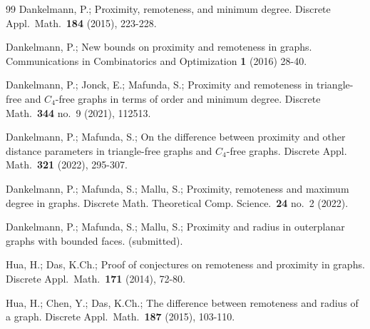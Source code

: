 \documentclass[a4paper,11pt]{article}
\begin{document}
\begin{thebibliography}{99}
 Dankelmann, P.; 
     Proximity, remoteness, and minimum degree. 
     Discrete Appl.\ Math.\ {\bf 184} (2015), 223-228.    

 Dankelmann, P.; 
     New bounds on proximity and remoteness in graphs. 
     Communications in Combinatorics and Optimization {\bf 1} (2016) 28-40.     
        
  Dankelmann, P.; Jonck, E.; Mafunda, S.; 
     Proximity and remoteness in triangle-free and $C_4$-free graphs in terms of order and minimum degree. 
     Discrete Math.\ {\bf 344} no.\ 9 (2021), 112513.
      
  Dankelmann, P.; Mafunda, S.;     
     On the difference between proximity and other distance parameters in triangle-free 
     graphs and $C_4$-free graphs. 
     Discrete Appl. Math.\ {\bf 321} (2022), 295-307.    

  Dankelmann, P.; Mafunda, S.; Mallu, S.;
     Proximity, remoteness and maximum degree in graphs. 
     Discrete Math. Theoretical Comp. Science.\ {\bf 24} no.\ 2 (2022).
     
  Dankelmann, P.; Mafunda, S.; Mallu, S.;
     Proximity and radius in outerplanar graphs with bounded faces. 
     (submitted).     
     
      
  Hua, H.;  Das, K.Ch.;
     Proof of conjectures on remoteness and proximity in graphs.
     Discrete Appl.\ Math.\ {\bf 171} (2014), 72-80.   
       
 Hua, H.; Chen, Y.;  Das, K.Ch.;
     The difference between remoteness and radius of a graph. 
     Discrete Appl.\ Math.\ {\bf 187} (2015), 103-110.   
   
   
     
     

\end{thebibliography}
\end{document}
